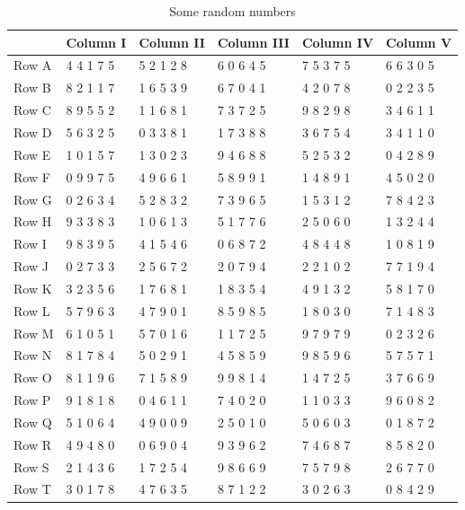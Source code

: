 \documentclass[
  11pt,
  a4paper,
  krantz2]{krantz}
\begin{document}
\begin{table}
\centering
\caption{\label{tab:unnamed-chunk-7}Some random numbers}
\centering
\fontsize{9}{11}\selectfont
\begin{tabular}[t]{llllll}
\toprule
\textbf{ } & \textbf{Column I} & \textbf{Column II} & \textbf{Column III} & \textbf{Column IV} & \textbf{Column V}\\
\midrule
Row A & 4 4 1 7 5 & 5 2 1 2 8 & 6 0 6 4 5 & 7 5 3 7 5 & 6 6 3 0 5\\
Row B & 8 2 1 1 7 & 1 6 5 3 9 & 6 7 0 4 1 & 4 2 0 7 8 & 0 2 2 3 5\\
Row C & 8 9 5 5 2 & 1 1 6 8 1 & 7 3 7 2 5 & 9 8 2 9 8 & 3 4 6 1 1\\
Row D & 5 6 3 2 5 & 0 3 3 8 1 & 1 7 3 8 8 & 3 6 7 5 4 & 3 4 1 1 0\\
Row E & 1 0 1 5 7 & 1 3 0 2 3 & 9 4 6 8 8 & 5 2 5 3 2 & 0 4 2 8 9\\
\addlinespace
Row F & 0 9 9 7 5 & 4 9 6 6 1 & 5 8 9 9 1 & 1 4 8 9 1 & 4 5 0 2 0\\
Row G & 0 2 6 3 4 & 5 2 8 3 2 & 7 3 9 6 5 & 1 5 3 1 2 & 7 8 4 2 3\\
Row H & 9 3 3 8 3 & 1 0 6 1 3 & 5 1 7 7 6 & 2 5 0 6 0 & 1 3 2 4 4\\
Row I & 9 8 3 9 5 & 4 1 5 4 6 & 0 6 8 7 2 & 4 8 4 4 8 & 1 0 8 1 9\\
Row J & 0 2 7 3 3 & 2 5 6 7 2 & 2 0 7 9 4 & 2 2 1 0 2 & 7 7 1 9 4\\
\addlinespace
Row K & 3 2 3 5 6 & 1 7 6 8 1 & 1 8 3 5 4 & 4 9 1 3 2 & 5 8 1 7 0\\
Row L & 5 7 9 6 3 & 4 7 9 0 1 & 8 5 9 8 5 & 1 8 0 3 0 & 7 1 4 8 3\\
Row M & 6 1 0 5 1 & 5 7 0 1 6 & 1 1 7 2 5 & 9 7 9 7 9 & 0 2 3 2 6\\
Row N & 8 1 7 8 4 & 5 0 2 9 1 & 4 5 8 5 9 & 9 8 5 9 6 & 5 7 5 7 1\\
Row O & 8 1 1 9 6 & 7 1 5 8 9 & 9 9 8 1 4 & 1 4 7 2 5 & 3 7 6 6 9\\
\addlinespace
Row P & 9 1 8 1 8 & 0 4 6 1 1 & 7 4 0 2 0 & 1 1 0 3 3 & 9 6 0 8 2\\
Row Q & 5 1 0 6 4 & 4 9 0 0 9 & 2 5 0 1 0 & 5 0 6 0 3 & 0 1 8 7 2\\
Row R & 4 9 4 8 0 & 0 6 9 0 4 & 9 3 9 6 2 & 7 4 6 8 7 & 8 5 8 2 0\\
Row S & 2 1 4 3 6 & 1 7 2 5 4 & 9 8 6 6 9 & 7 5 7 9 8 & 2 6 7 7 0\\
Row T & 3 0 1 7 8 & 4 7 6 3 5 & 8 7 1 2 2 & 3 0 2 6 3 & 0 8 4 2 9\\

\end{tabular}
\end{table}
\end{document}
